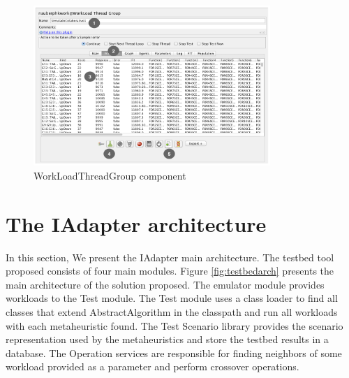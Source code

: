 \documentclass[espaco=umemeio,chapter=TITLE,twoside,openright]{abnt}
\begin{document}
\begin{figure}[h]
\centering
\includegraphics[width=0.8\textwidth]{./images/tela1iadapter.png}
\caption{WorkLoadThreadGroup component}
\label{fig:tela1iadapter}
\end{figure}

\vspace*{-.075in}
\section{The IAdapter architecture}
\label{sec:technique}
\vspace*{-.075in}


In this section, We present the IAdapter main architecture. The testbed tool proposed consists of four main modules.  Figure \ref{fig:testbedarch} presents the main architecture of the solution proposed. The emulator module provides workloads to the Test module. The Test module uses a class loader to find all classes that extend AbstractAlgorithm in the classpath and run all workloads with each metaheuristic found. The Test Scenario library provides the scenario representation used by the metaheuristics and store the testbed results in a database. The Operation services are responsible for finding neighbors of some workload provided as a parameter and perform crossover operations.
\end{document}
